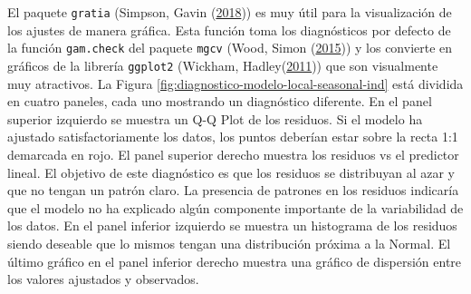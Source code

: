 \documentclass[
  12pt]{article}
\newenvironment{Shaded}{}{}
\newcommand{\CommentTok}[1]{\textcolor[rgb]{0.38,0.63,0.69}{\textit{#1}}}
\newcommand{\DataTypeTok}[1]{\textcolor[rgb]{0.56,0.13,0.00}{#1}}
\newcommand{\KeywordTok}[1]{\textcolor[rgb]{0.00,0.44,0.13}{\textbf{#1}}}
\newcommand{\NormalTok}[1]{#1}
\newcommand{\OperatorTok}[1]{\textcolor[rgb]{0.40,0.40,0.40}{#1}}
\newcommand{\StringTok}[1]{\textcolor[rgb]{0.25,0.44,0.63}{#1}}
\begin{document}
El paquete \texttt{gratia} (Simpson, Gavin (\protect\hyperlink{ref-RN5389}{2018})) es muy útil para la visualización de los ajustes de manera gráfica. Esta función toma los diagnósticos por defecto de la función \texttt{gam.check} del paquete \texttt{mgcv} (Wood, Simon (\protect\hyperlink{ref-RN5393}{2015})) y los convierte en gráficos de la librería \texttt{ggplot2} (Wickham, Hadley(\protect\hyperlink{ref-RN5391}{2011})) que son visualmente muy atractivos.
La Figura \ref{fig:diagnostico-modelo-local-seasonal-ind} está dividida en cuatro paneles, cada uno mostrando un diagnóstico diferente. En el panel superior izquierdo se muestra un Q-Q Plot de los residuos. Si el modelo ha ajustado satisfactoriamente los datos, los puntos deberían estar sobre la recta 1:1 demarcada en rojo. El panel superior derecho muestra los residuos vs el predictor lineal. El objetivo de este diagnóstico es que los residuos se distribuyan al azar y que no tengan un patrón claro. La presencia de patrones en los residuos indicaría que el modelo no ha explicado algún componente importante de la variabilidad de los datos. En el panel inferior izquierdo se muestra un histograma de los residuos siendo deseable que lo mismos tengan una distribución próxima a la Normal. El último gráfico en el panel inferior derecho muestra una gráfico de dispersión entre los valores ajustados y observados.

\begin{Shaded}
\end{Shaded}
\end{document}
